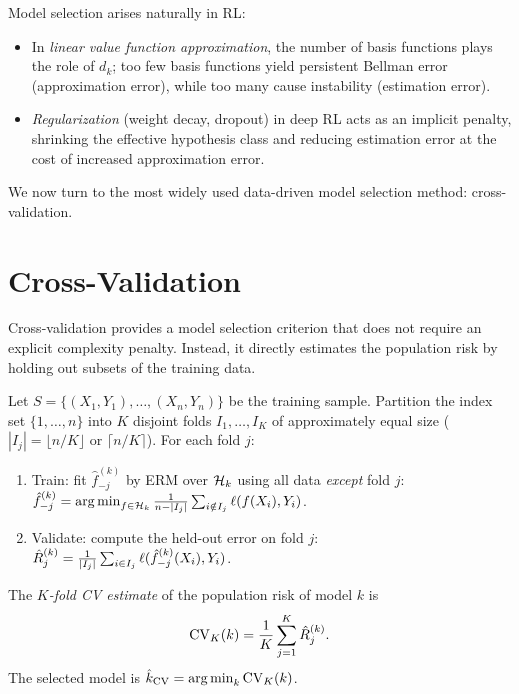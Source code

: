 \documentclass[11pt,a4paper]{article}
\begin{document}
\begin{rlconnection}[title={Model Selection in RL}]
Model selection arises naturally in RL:
\begin{itemize}[nosep]
    \item In \emph{linear value function approximation}, the number
    of basis functions plays the role of $d_k$; too few basis functions
    yield persistent Bellman error (approximation error), while too
    many cause instability (estimation error).
    \item \emph{Regularization} (weight decay, dropout) in deep RL
    acts as an implicit penalty, shrinking the effective hypothesis
    class and reducing estimation error at the cost of increased
    approximation error.
\end{itemize}
\end{rlconnection}

We now turn to the most widely used data-driven model selection
method: cross-validation.


\section{Cross-Validation}
\label{sec:cross_validation}

Cross-validation provides a model selection criterion that does not
require an explicit complexity penalty.  Instead, it directly
estimates the population risk by holding out subsets of the training
data.

\begin{definition}
\label{def:kfold}
Let $S = \{(X_1, Y_1), \ldots, (X_n, Y_n)\}$ be the training
sample.  Partition the index set $\{1, \ldots, n\}$ into $K$
disjoint folds $I_1, \ldots, I_K$ of approximately equal size
($|I_j| = \lfloor n/K \rfloor$ or $\lceil n/K \rceil$).  For each
fold $j$:
\begin{enumerate}[nosep,label=(\roman*)]
    \item Train: fit $\hat{f}_{-j}^{(k)}$ by ERM over $\mathcal{H}_k$
    using all data \emph{except} fold $j$:
    $\hat{f}_{-j}^{(k)} = \operatorname{arg\,min}_{f \in \mathcal{H}_k}
    \frac{1}{n - |I_j|}\sum_{i \notin I_j} \ell(f(X_i), Y_i)$.
    \item Validate: compute the held-out error on fold $j$:
    $\hat{R}_j^{(k)} = \frac{1}{|I_j|}\sum_{i \in I_j}
    \ell(\hat{f}_{-j}^{(k)}(X_i), Y_i)$.
\end{enumerate}
The \emph{$K$-fold CV estimate} of the population risk of model $k$
is
\[
    \mathrm{CV}_K(k) = \frac{1}{K}\sum_{j=1}^K \hat{R}_j^{(k)}.
\]
The selected model is $\hat{k}_{\mathrm{CV}} = \operatorname{arg\,min}_k
\mathrm{CV}_K(k)$.
\end{definition}
\end{document}
